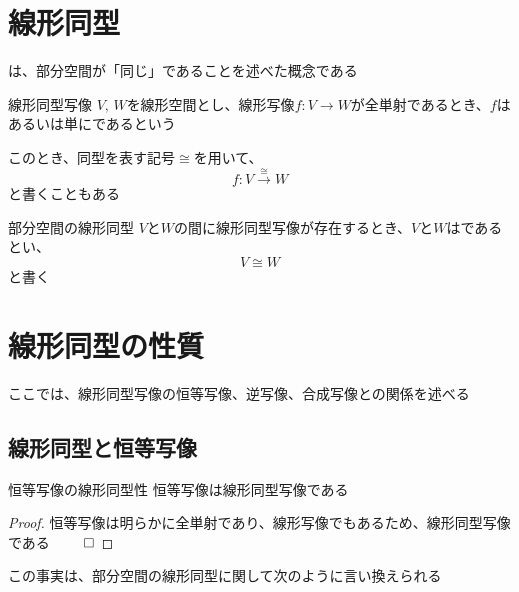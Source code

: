\documentclass[../../../topic_linear-algebra]{subfiles}
\begin{document}
\sectionline
\section{線形同型}

は、部分空間が「同じ」であることを述べた概念である

\begin{definition}{線形同型写像}\label{def:linear-isomorphism}
  $V,\,W$を線形空間とし、線形写像$f\colon V \to W$が全単射であるとき、$f$はあるいは単にであるという

  このとき、同型を表す記号$\cong$を用いて、
  \begin{equation*}
    f\colon V \xrightarrow{\cong} W
  \end{equation*}
  と書くこともある
\end{definition}

\begin{definition}{部分空間の線形同型}\label{def:linear-subspace-isomorphism}
  $V$と$W$の間に線形同型写像が存在するとき、$V$と$W$はであるとい、
  \begin{equation*}
    V \cong W
  \end{equation*}
  と書く
\end{definition}

\sectionline
\section{線形同型の性質}

ここでは、線形同型写像の恒等写像、逆写像、合成写像との関係を述べる

\subsection{線形同型と恒等写像}

\begin{theorem}{恒等写像の線形同型性}
  恒等写像は線形同型写像である
\end{theorem}

\begin{proof}
  恒等写像は明らかに全単射であり、線形写像でもあるため、線形同型写像である $\qed$
\end{proof}

この事実は、部分空間の線形同型に関して次のように言い換えられる
\end{document}
